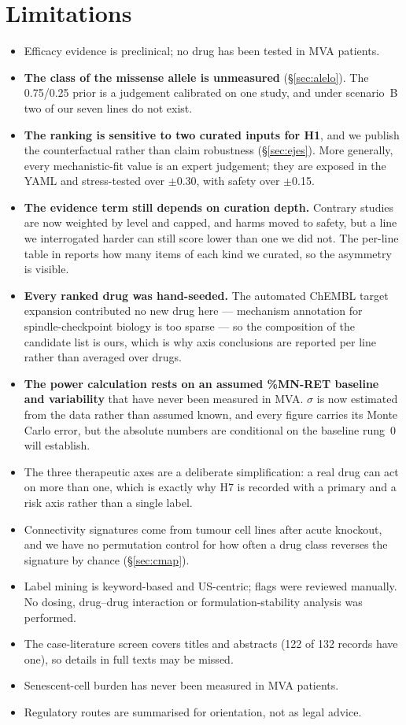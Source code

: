 \documentclass[10pt]{article}
\begin{document}
\section{Limitations}
\begin{itemize}
\item Efficacy evidence is preclinical; no drug has been tested in MVA patients.
\item \textbf{The class of the missense allele is unmeasured} (§\ref{sec:alelo}). The 0.75/0.25 prior is a
  judgement calibrated on one study, and under scenario~B two of our seven lines do not exist.
\item \textbf{The ranking is sensitive to two curated inputs for H1}, and we publish the counterfactual rather than
  claim robustness (§\ref{sec:ejes}). More generally, every mechanistic-fit value is an expert judgement; they are
  exposed in the YAML and stress-tested over $\pm$0.30, with safety over $\pm$0.15.
\item \textbf{The evidence term still depends on curation depth.} Contrary studies are now weighted by level and
  capped, and harms moved to safety, but a line we interrogated harder can still score lower than one we did not.
  The per-line table in  reports how many items of each kind we curated, so the asymmetry is
  visible.
\item \textbf{Every ranked drug was hand-seeded.} The automated ChEMBL target expansion contributed no new drug
  here --- mechanism annotation for spindle-checkpoint biology is too sparse --- so the composition of the candidate
  list is ours, which is why axis conclusions are reported per line rather than averaged over drugs.
\item \textbf{The power calculation rests on an assumed \%MN-RET baseline and variability} that have never been
  measured in MVA. $\sigma$ is now estimated from the data rather than assumed known, and every figure carries its
  Monte Carlo error, but the absolute numbers are conditional on the baseline rung~0 will establish.
\item The three therapeutic axes are a deliberate simplification: a real drug can act on more than one, which is
  exactly why H7 is recorded with a primary and a risk axis rather than a single label.
\item Connectivity signatures come from tumour cell lines after acute knockout, and we have no permutation control
  for how often a drug class reverses the signature by chance (§\ref{sec:cmap}).
\item Label mining is keyword-based and US-centric; flags were reviewed manually. No dosing, drug--drug interaction
  or formulation-stability analysis was performed.
\item The case-literature screen covers titles and abstracts (122 of 132 records have one), so details in full
  texts may be missed.
\item Senescent-cell burden has never been measured in MVA patients.
\item Regulatory routes are summarised for orientation, not as legal advice.
\end{itemize}
\end{document}

